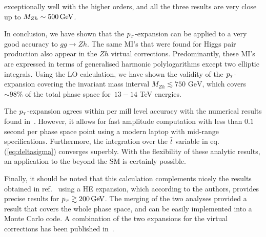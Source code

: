 exceptionally well with the higher orders, and all the
three results are very close up to $M_{Zh} \sim 500\,\textrm{GeV}$.
\par  In conclusion, we have shown that the $p_{\scriptscriptstyle T}$-expansion can be applied to a very good accuracy to $gg\to Zh$.  The same MI's that were found for Higgs pair production \cite{Bonciani:2018omm} also appear in the $Zh$ virtual corrections. Predominantly, these MI's are expressed in terms of generalised harmonic polylogarithms except two elliptic integrals. Using the LO calculation, we have shown the validity of the $p_{\scriptscriptstyle T}$-expansion covering the invariant mass interval  $M_{Zh}\lesssim 750\text{ GeV}$, which covers $\sim 98\%$ of the total phase space for~$13-14$ TeV energies.
\par The $p_{\scriptscriptstyle T}$-expansion agrees within per mill level accuracy with the numerical results found in~\cite{Chen:2020gae}. However, it allows for fast amplitude computation with less than $0.1$ second per phase space point using a modern laptop with mid-range specifications. Furthermore, the integration over the $\hat{t}$ variable
in eq.(\ref{eq:deltasigma}) converges superbly.  With the flexibility of these analytic
results, an application to the beyond-the SM is certainly
possible.
\par Finally, it should be noted that this calculation complements
nicely the results obtained in ref.~\cite{Davies:2020drs} using a HE
expansion, which according to the authors, provides precise results for
$p_{\scriptscriptstyle T} \gtrsim 200\,\textrm{GeV}$. The merging of the two analyses provided
a result that covers the whole phase space, and can be easily implemented into a
Monte Carlo code. A combination of the two expansions for the virtual corrections has been published in~\cite{Bellafronte:2022jmo}.